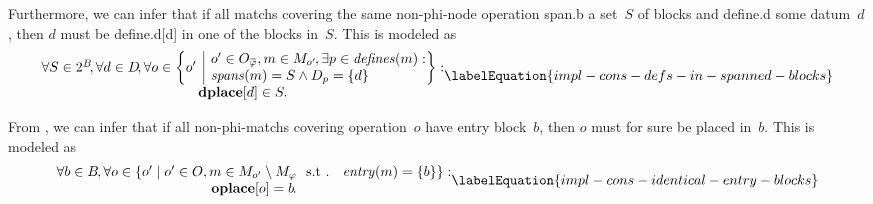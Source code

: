 Furthermore, we can infer that if all \glspl{match} covering the same
non-\gls{phi-node} \gls{operation} \gls{span.b} a set~$S$ of \glspl{block} and
\gls{define.d} some \gls{datum}~$d$\hspace{-1pt}, then $d$ must be
\gls{define.d}[d] in one of the \glspl{block} in~$S$\hspace{-.8pt}.
%
This is modeled as
%
\begin{equation}
  \begin{array}{@{}c@{}}
    \forall S \in \mPowerset{\mBlockSet} \hspace{-2pt},
    \forall d \in \mDataSet \!,
    \forall o \in
      \mSetBuilder*{o'}%
                   {
                     \begin{array}{@{}l@{}}
                       o' \in \mOpCompSet{\mPhi},
                       m \in \mMatchSet[o'] \hspace{-1pt},
                       \exists p \in \mDefines(m) : \\
                       \mSpans(m) = S \mAnd \mDataSet[p] = \mSet{d}
                     \end{array}
                   } : \\
    \mVar{dplace}[d] \in S.
  \end{array}
  \labelEquation{impl-cons-defs-in-spanned-blocks}
\end{equation}

From , we can infer that if all
non-\glspl{phi-match} covering \gls{operation}~$o$ have \gls{entry
  block}~$b$\hspace{-1pt}, then $o$ must for sure be placed in~$b$\hspace{-1pt}.
%
This is modeled as
%
\begin{equation}
  \begin{array}{@{}c@{}}
    \forall b \in \mBlockSet \hspace{-1pt},
    \forall o \in
      \mSetBuilder{o'}%
                  {
                    o' \in \mOpSet,
                    m \in \mMatchSet[o'] \setminus \mPhiMatchSet
                    \text{ \st }
                    \mEntry(m) = \mSet{b}
                  } : \\
    \mVar{oplace}[o] = b \hspace{-1pt}.
  \end{array}
  \labelEquation{impl-cons-identical-entry-blocks}
\end{equation}

